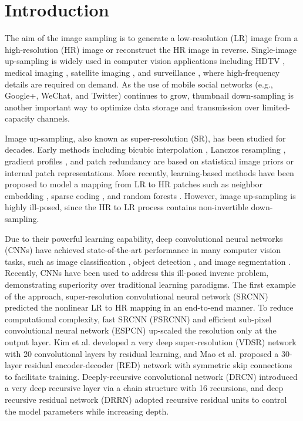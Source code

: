 \documentclass[runningheads]{llncs}
\begin{document}
\section{Introduction}
The aim of the image sampling is to generate a low-resolution (LR) image from a high-resolution (HR) image or reconstruct the HR image in reverse. Single-image up-sampling is widely used in computer vision applications including HDTV \cite{hdtv}, medical imaging \cite{medical}, satellite imaging \cite{satellite}, and surveillance \cite{surveillance}, where high-frequency details are required on demand. As the use of mobile social networks (e.g., Google+, WeChat, and Twitter) continues to grow, thumbnail down-sampling is another important way to optimize data storage and transmission over limited-capacity channels.

Image up-sampling, also known as super-resolution (SR), has been studied for decades. Early methods including bicubic interpolation \cite{bicubic}, Lanczos resampling \cite{lanczos}, gradient profiles \cite{gradient}, and patch redundancy \cite{patch} are based on statistical image priors or internal patch representations. More recently, learning-based methods have been proposed to model a mapping from LR to HR patches such as neighbor embedding \cite{ne}, sparse coding \cite{sc}, and random forests \cite{rf}. However, image up-sampling is highly ill-posed, since the HR to LR process contains non-invertible down-sampling.

Due to their powerful learning capability, deep convolutional neural networks (CNNs) have achieved state-of-the-art performance in many computer vision tasks, such as image classification \cite{imagenet}, object detection \cite{detection}, and image segmentation \cite{deeplab}. Recently, CNNs have been used to address this ill-posed inverse problem, demonstrating superiority over traditional learning paradigms. The first example of the approach, super-resolution convolutional neural network (SRCNN) \cite{srcnn} predicted the nonlinear LR to HR mapping in an end-to-end manner. To reduce computational complexity, fast SRCNN (FSRCNN) \cite{fsrcnn} and efficient sub-pixel convolutional neural network (ESPCN) \cite{espcn} up-scaled the resolution only at the output layer. Kim et al. \cite{vdsr} developed a very deep super-resolution (VDSR) network with 20 convolutional layers by residual learning, and Mao et al. \cite{red} proposed a 30-layer residual encoder-decoder (RED) network with symmetric skip connections to facilitate training. Deeply-recursive convolutional network (DRCN) \cite{drcn} introduced a very deep recursive layer via a chain structure with 16 recursions, and deep recursive residual network (DRRN) \cite{drrn} adopted recursive residual units to control the model parameters while increasing depth.
\end{document}
